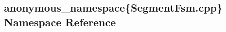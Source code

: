 \hypertarget{namespaceanonymous__namespace_02SegmentFsm_8cpp_03}{}\subsection{anonymous\+\_\+namespace\{Segment\+Fsm.\+cpp\} Namespace Reference}
\label{namespaceanonymous__namespace_02SegmentFsm_8cpp_03}
